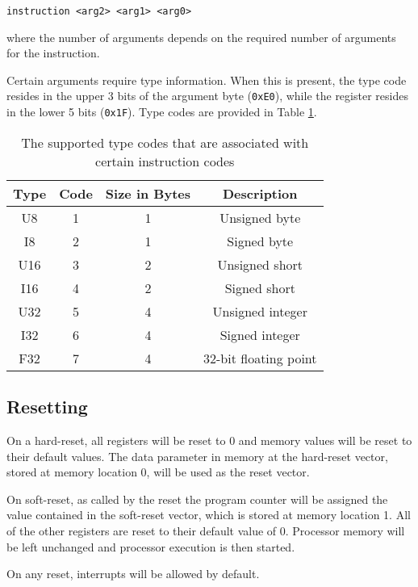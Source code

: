 \documentclass{article}
\begin{document}
\begin{center}
    \texttt{instruction <arg2> <arg1> <arg0>}
\end{center}

where the number of arguments depends on the required number of arguments for the instruction.

Certain arguments require type information. When this is present, the type code resides in the upper 3 bits of the argument byte (\texttt{0xE0}), while the register resides in the lower 5 bits (\texttt{0x1F}). Type codes are provided in Table \ref{table:type-codes}.

\begin{table}[h!]
	\centering
	\begin{tabular}{c|cc|c}
		\hline
		Type & Code & Size in Bytes & Description \\
		\hline
		 U8 & 1 & 1 & Unsigned byte \\
		 I8 & 2 & 1 & Signed byte \\
		 U16 & 3 & 2 & Unsigned short\\
		 I16 & 4 & 2 & Signed short \\
		 U32 & 5 & 4 & Unsigned integer \\
		 I32 & 6 & 4 & Signed integer \\
		 F32 & 7 & 4 & 32-bit floating point \\
		\hline
	\end{tabular}
	\caption{The supported type codes that are associated with certain instruction codes}
	\label{table:type-codes}
\end{table}

\subsection{Resetting}

On a hard-reset, all registers will be reset to 0 and memory values will be reset to their default values. The data parameter in memory at the hard-reset vector, stored at memory location 0, will be used as the reset vector.

On soft-reset, as called by the reset the program counter will be assigned the value contained in the soft-reset vector, which is stored at memory location 1. All of the other registers are reset to their default value of 0. Processor memory will be left unchanged and processor execution is then started.

On any reset, interrupts will be allowed by default.
\end{document}
